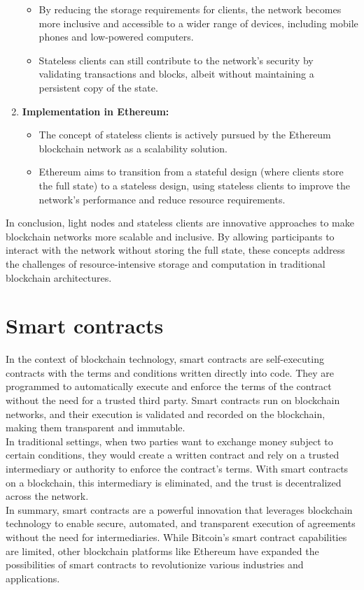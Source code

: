 \documentclass{report}
\begin{document}
\begin{enumerate}
\begin{itemize}
		\item By reducing the storage requirements for clients, the network becomes more inclusive and accessible to a wider range of devices, including mobile phones and low-powered computers.
		\item Stateless clients can still contribute to the network's security by validating transactions and blocks, albeit without maintaining a persistent copy of the state.
	\end{itemize}
	\item \textbf{Implementation in Ethereum:}
	\begin{itemize}
		\item The concept of stateless clients is actively pursued by the Ethereum blockchain network as a scalability solution.
		\item Ethereum aims to transition from a stateful design (where clients store the full state) to a stateless design, using stateless clients to improve the network's performance and reduce resource requirements.
	\end{itemize}
\end{enumerate}
In conclusion, light nodes and stateless clients are innovative approaches to make blockchain networks more scalable and inclusive. By allowing participants to interact with the network without storing the full state, these concepts address the challenges of resource-intensive storage and computation in traditional blockchain architectures.

\section{Smart contracts}
In the context of blockchain technology, smart contracts are self-executing contracts with the terms and conditions written directly into code. They are programmed to automatically execute and enforce the terms of the contract without the need for a trusted third party. Smart contracts run on blockchain networks, and their execution is validated and recorded on the blockchain, making them transparent and immutable.\\
In traditional settings, when two parties want to exchange money subject to certain conditions, they would create a written contract and rely on a trusted intermediary or authority to enforce the contract's terms. With smart contracts on a blockchain, this intermediary is eliminated, and the trust is decentralized across the network.\\
In summary, smart contracts are a powerful innovation that leverages blockchain technology to enable secure, automated, and transparent execution of agreements without the need for intermediaries. While Bitcoin's smart contract capabilities are limited, other blockchain platforms like Ethereum have expanded the possibilities of smart contracts to revolutionize various industries and applications.
\end{document}
